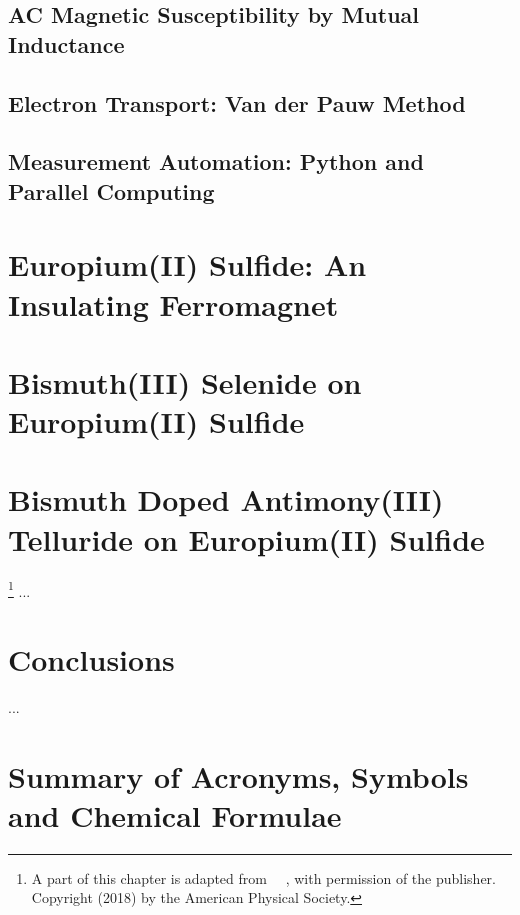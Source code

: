 \documentclass{report}
\begin{document}
    \section{AC Magnetic Susceptibility by Mutual Inductance}
    \section{Electron Transport: Van der Pauw Method}
    \section{Measurement Automation: Python and Parallel Computing}

\chapter{Europium(II) Sulfide: An Insulating Ferromagnet}
\label{ch:EuS}

\chapter{Bismuth(III) Selenide on Europium(II) Sulfide}
\label{ch:bilayer2014}


\chapter{Bismuth Doped Antimony(III) Telluride on Europium(II) Sulfide}
\label{ch:bilayer2018}\footnote[2]{A part of this chapter is adapted from ~\cite{bilayer2018}~, with permission of the publisher. Copyright (2018) by the American Physical Society.}
...

\chapter{Conclusions}
\label{ch:conclusions}
     ...
\appendix
\chapter{Summary of Acronyms, Symbols and Chemical Formulae}
    

\printbibliography
\end{document}
